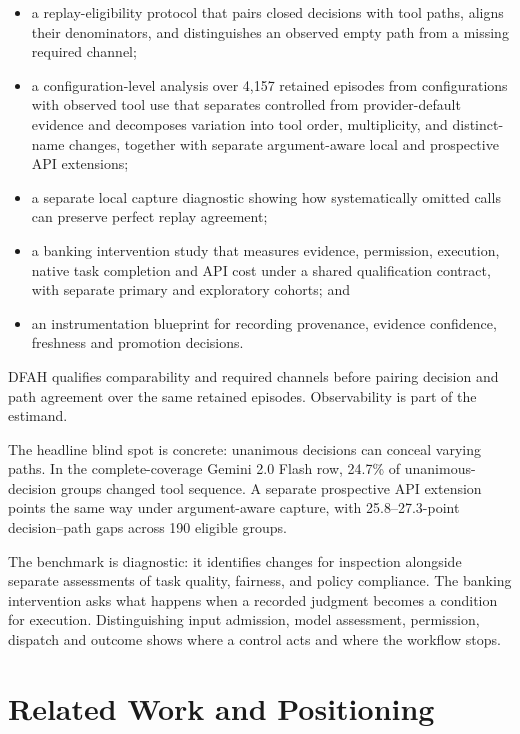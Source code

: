 \documentclass{article}
\begin{document}
\begin{itemize}
  \item a replay-eligibility protocol that pairs
  closed decisions with tool paths, aligns their denominators, and distinguishes
  an observed empty path from a missing required channel;
  \item a configuration-level analysis over 4,157 retained episodes from configurations with observed tool use that
  separates controlled from provider-default evidence and decomposes variation
  into tool order, multiplicity, and distinct-name changes, together with
  separate argument-aware local and prospective API extensions;
  \item a separate local capture diagnostic showing how systematically omitted
  calls can preserve perfect replay agreement;
  \item a banking intervention study that measures evidence, permission,
  execution, native task completion and API cost under a shared qualification
  contract, with separate primary and exploratory cohorts; and
  \item an instrumentation blueprint for recording provenance, evidence
  confidence, freshness and promotion decisions.
\end{itemize}

DFAH qualifies comparability and required channels before pairing decision and
path agreement over the same retained episodes. Observability is part of the estimand.

The headline blind spot is concrete: unanimous decisions can conceal varying
paths.  In the complete-coverage Gemini 2.0 Flash row, 24.7\% of
unanimous-decision groups changed tool sequence.  A separate prospective API
extension points the same way under argument-aware capture, with
25.8--27.3-point decision--path gaps across 190 eligible groups.

The benchmark is diagnostic: it identifies changes for inspection alongside
separate assessments of task quality, fairness, and policy compliance.
The banking intervention asks what happens when a recorded judgment becomes
a condition for execution. Distinguishing input admission, model assessment,
permission, dispatch and outcome shows where a control acts and where the
workflow stops.

\section{Related Work and Positioning}
\end{document}
